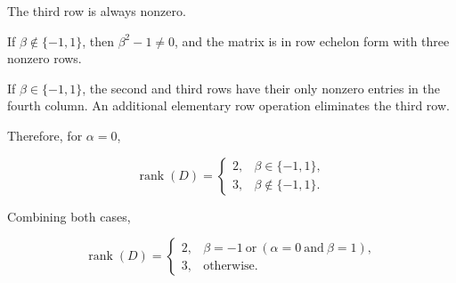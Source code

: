 \begin{enumerate}[label=\alph*)]
\begin{answer}
        The third row is always nonzero.

        If $\beta\notin\{-1,1\}$, then
        $\beta^2-1\neq0$, and the matrix
        is in row echelon form with
        three nonzero rows.

        If $\beta\in\{-1,1\}$, the second
        and third rows have their only
        nonzero entries in the fourth column.
        An additional elementary row operation
        eliminates the third row.

        Therefore, for $\alpha=0$,

        $$
        \operatorname{rank}(D)=
        \begin{cases}
            2, & \beta\in\{-1,1\},\\
            3, & \beta\notin\{-1,1\}.
        \end{cases}
        $$

        Combining both cases,

        $$
        \boxed{
        \operatorname{rank}(D)=
        \begin{cases}
            2, & \beta=-1
                 \ \text{or}\
                 (\alpha=0\ \text{and}\ \beta=1),\\[0.4em]
            3, & \text{otherwise}.
        \end{cases}
        }
        $$
    \end{answer}

\end{enumerate}
